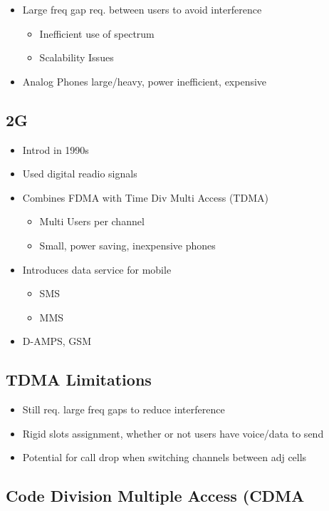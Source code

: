 \begin{itemize}
	\item Large freq gap req. between users to avoid interference
	\begin{itemize}
		\item Inefficient use of spectrum
		\item Scalability Issues
	\end{itemize}
	\item Analog Phones large/heavy, power inefficient, expensive
\end{itemize}

\subsection{2G}

\begin{itemize}
	\item Introd in 1990s
	\item Used digital readio signals
	\item Combines FDMA with Time Div Multi Access (TDMA)
	\begin{itemize}
		\item Multi Users per channel
		\item Small, power saving, inexpensive phones
	\end{itemize}
	\item Introduces data service for mobile
	\begin{itemize}
		\item SMS
		\item MMS
	\end{itemize}
	\item D-AMPS, GSM
\end{itemize}

\subsection{TDMA Limitations}

\begin{itemize}
	\item Still req. large freq gaps to reduce interference
	\item Rigid slots assignment, whether or not users have voice/data to
		send
	\item Potential for call drop when switching channels between adj cells
\end{itemize}

\subsection{Code Division Multiple Access (CDMA}

